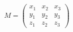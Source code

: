 \documentclass[preview]{standalone}
\begin{document}
\begin{align*}
M = \begin{pmatrix} x_1 & x_2 & x_3 \\ y_1 & y_2 & y_3 \\ z_1 & z_2 & z_3 \end{pmatrix}
\end{align*}
\end{document}
